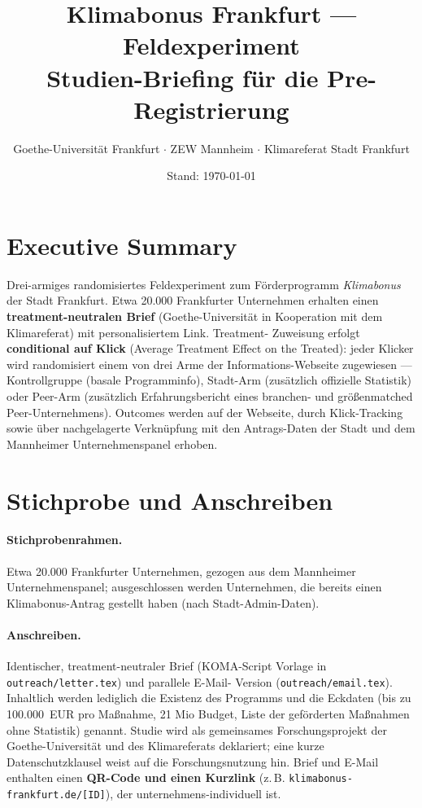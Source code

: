 \documentclass[11pt, a4paper]{scrartcl}
\title{Klimabonus Frankfurt --- Feldexperiment\\
\Large Studien-Briefing für die Pre-Registrierung}
\author{Goethe-Universität Frankfurt \(\cdot\) ZEW Mannheim \(\cdot\)
        Klimareferat Stadt Frankfurt}
\date{Stand: \today}
\newcommand{\var}[1]{\texttt{\small #1}}
\begin{document}
\maketitle

\section*{Executive Summary}

Drei-armiges randomisiertes Feldexperiment zum Förderprogramm
\emph{Klimabonus} der Stadt Frankfurt. Etwa 20.000 Frankfurter Unternehmen
erhalten einen \textbf{treatment-neutralen Brief} (Goethe-Universität in
Kooperation mit dem Klimareferat) mit personalisiertem Link. Treatment-
Zuweisung erfolgt \textbf{conditional auf Klick} (Average Treatment Effect
on the Treated): jeder Klicker wird randomisiert einem von drei Arme der
Informations-Webseite zugewiesen --- Kontrollgruppe (basale Programminfo),
Stadt-Arm (zusätzlich offizielle Statistik) oder Peer-Arm (zusätzlich
Erfahrungsbericht eines branchen- und größenmatched Peer-Unternehmens).
Outcomes werden auf der Webseite, durch Klick-Tracking sowie über
nachgelagerte Verknüpfung mit den Antrags-Daten der Stadt und dem
Mannheimer Unternehmenspanel erhoben.

\section{Stichprobe und Anschreiben}

\paragraph{Stichprobenrahmen.} Etwa 20.000 Frankfurter Unternehmen,
gezogen aus dem Mannheimer Unternehmenspanel; ausgeschlossen werden
Unternehmen, die bereits einen Klimabonus-Antrag gestellt haben (nach
Stadt-Admin-Daten).

\paragraph{Anschreiben.} Identischer, treatment-neutraler Brief
(KOMA-Script Vorlage in \var{outreach/letter.tex}) und parallele E-Mail-
Version (\var{outreach/email.tex}). Inhaltlich werden lediglich die
Existenz des Programms und die Eckdaten (bis zu 100.000~EUR pro Maßnahme,
21 Mio Budget, Liste der geförderten Maßnahmen ohne Statistik) genannt.
Studie wird als gemeinsames Forschungsprojekt der Goethe-Universität und
des Klimareferats deklariert; eine kurze Datenschutzklausel weist auf die
Forschungsnutzung hin. Brief und E-Mail enthalten einen \textbf{QR-Code
und einen Kurzlink} (z.\,B. \texttt{klimabonus-frankfurt.de/[ID]}), der
unternehmens-individuell ist.
\end{document}
